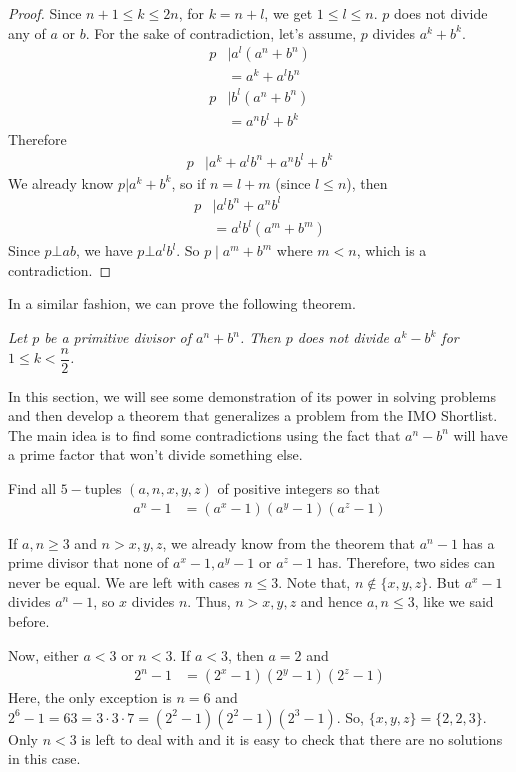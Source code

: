 \documentclass{subfile}
\begin{document}
		\begin{proof}
			Since $n+1\leq k\leq2n$, for $k=n+l$, we get $1\leq l\leq n$. $p$ does not divide any of $a$ or $b$. For the sake of contradiction, let's assume, $p$ divides $a^k+b^k$.
				\begin{align*}
					p
						& \mid a^l(a^n+b^n)\\
						& = a^k+a^lb^n\\
					p
						& \mid b^l(a^n+b^n)\\
						& = a^nb^l+b^k
				\end{align*}
			Therefore
			\begin{align*}
				p
					& \mid a^k+a^lb^n+a^nb^l+b^k
			\end{align*}
			We already know $p|a^k+b^k$, so if $n=l+m$ (since $l\leq n$), then
				\begin{align*}
					p
						& \mid a^lb^n+a^nb^l\\
						& = a^lb^l(a^m+b^m)
				\end{align*}
			Since $p\bot ab$, we have $p\bot a^lb^l$. So $p\mid a^m+b^m$ where $m< n$, which is a contradiction.
		\end{proof}
	In a similar fashion, we can prove the following theorem.
		\begin{theorem}\slshape
			Let $p$ be a primitive divisor of $a^n+b^n$. Then $p$ does not divide $a^k-b^k$ for $1\leq k<\dfrac{n}{2}$.
		\end{theorem}

	In this section, we will see some demonstration of its power in solving problems and then develop a theorem that generalizes a problem from the IMO Shortlist. The main idea is to find some contradictions using the fact that $a^n-b^n$ will have a prime factor that won't divide something else.
		\begin{problem}
			Find all $5-$tuples $(a,n,x,y,z)$ of positive integers so that
				\begin{align*}
					a^n-1 & = (a^x-1)(a^y-1)(a^z-1)
				\end{align*}
		\end{problem}

		\begin{solution}
			If $a,n\geq3$ and $n>x,y,z$, we already know from the theorem that $a^n-1$ has a prime divisor that none of $a^x-1,a^y-1$ or $a^z-1$ has. Therefore, two sides can never be equal. We are left with cases $n\leq3$. Note that, $n\notin\{x,y,z\}$. But $a^x-1$ divides $a^n-1$, so $x$ divides $n$. Thus, $n>x,y,z$ and hence $a,n\leq3$, like we said before.

			Now, either $a<3$ or $n<3$. If $a<3$, then $a=2$ and
				\begin{align*}
					2^n-1 & = (2^x-1)(2^y-1)(2^z-1)
				\end{align*}
			Here, the only exception is $n=6$ and $2^6-1=63=3\cdot3\cdot7=(2^2-1)(2^2-1)(2^3-1)$. So, $\{x,y,z\}=\{2,2,3\}$. Only $n<3$ is left to deal with and it is easy to check that there are no solutions in this case.
		\end{solution}
\end{document}
